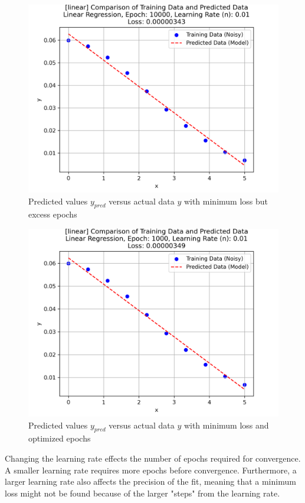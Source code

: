 \documentclass[letterpaper, 10 pt, conference]{ieeeconf}  %
\begin{document}
\begin{figure}[h!]
   \centering
   \includegraphics[width=0.8\linewidth]{../Figures/linear_regression_e_10000_n_0.01.png}
   \caption{Predicted values $y_{pred}$ versus actual data $y$ with minimum loss but excess epochs}
   \label{fig:Lin_b_less_n}
\end{figure}

\begin{figure}[h!]
   \centering
   \includegraphics[width=0.8\linewidth]{../Figures/linear_regression_e_1000_n_0.01.png}
   \caption{Predicted values $y_{pred}$ versus actual data $y$ with minimum loss and optimized epochs}
   \label{fig:Lin_b_min_loss}
\end{figure}

Changing the learning rate effects the number of epochs required for convergence. 
A smaller learning rate requires more epochs before convergence.
Furthermore, a larger learning rate also affects the precision of the fit, meaning that a minimum loss might not be found because of the larger "steps" from the learning rate. 
\end{document}
